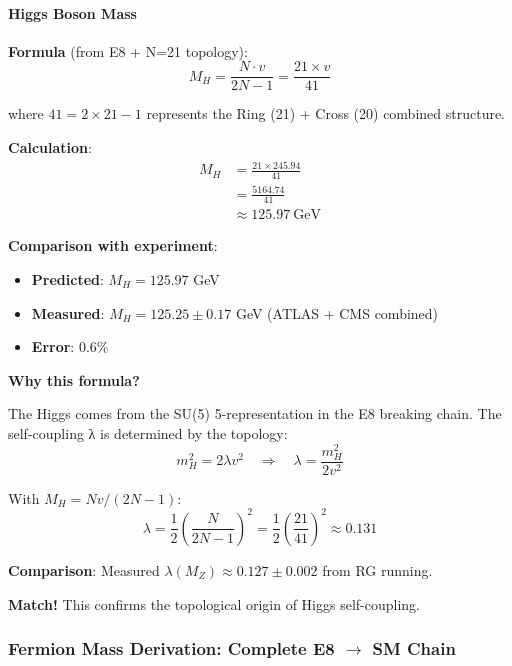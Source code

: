 \documentclass[12pt,a4paper]{article}
\begin{document}
\paragraph{Higgs Boson Mass}

\textbf{Formula} (from E8 + N=21 topology):
\begin{equation}
M_H = \frac{N \cdot v}{2N - 1} = \frac{21 \times v}{41}
\end{equation}

where $41 = 2 \times 21 - 1$ represents the Ring (21) + Cross (20) combined structure.

\textbf{Calculation}:
\begin{align}
M_H &= \frac{21 \times 245.94}{41} \\
&= \frac{5164.74}{41} \\
&\approx 125.97\ \text{GeV}
\end{align}

\textbf{Comparison with experiment}:
\begin{itemize}
\item \textbf{Predicted}: $M_H = 125.97$ GeV
\item \textbf{Measured}: $M_H = 125.25 \pm 0.17$ GeV (ATLAS + CMS combined)
\item \textbf{Error}: 0.6\%
\end{itemize}

\textbf{Why this formula?}

The Higgs comes from the SU(5) 5-representation in the E8 breaking chain. The self-coupling λ is determined by the topology:
\begin{equation}
m_H^2 = 2\lambda v^2 \quad \Rightarrow \quad \lambda = \frac{m_H^2}{2v^2}
\end{equation}

With $M_H = Nv/(2N-1)$:
\begin{equation}
\lambda = \frac{1}{2} \left(\frac{N}{2N-1}\right)^2 = \frac{1}{2} \left(\frac{21}{41}\right)^2 \approx 0.131
\end{equation}

\textbf{Comparison}: Measured $\lambda(M_Z) \approx 0.127 \pm 0.002$ from RG running.

\textbf{Match!} This confirms the topological origin of Higgs self-coupling.

\subsubsection{Fermion Mass Derivation: Complete E8 $\to$ SM Chain}
\end{document}
